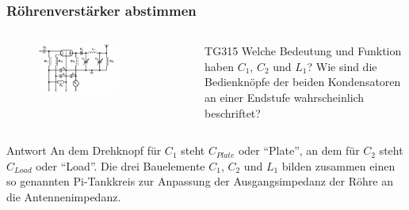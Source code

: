 \begin{frame}
  \frametitle{Röhrenverstärker abstimmen}
  \begin{columns}
    \begin{figure}
      \includegraphics[width=0.65\textwidth,height=.5\textheight,keepaspectratio]{a07/TG313.png}
    \end{figure}
    \begin{center}
      \begin{exampleblock}{TG315}
        Welche Bedeutung und Funktion haben $C_1$, $C_2$ und $L_1$? Wie sind die Bedienknöpfe der beiden Kondensatoren an einer Endstufe wahrscheinlich beschriftet?
      \end{exampleblock}
    \end{center}
  \end{columns}
  \pause
  \begin{exampleblock}{Antwort}
    An dem Drehknopf für $C_1$ steht $C_{Plate}$ oder ``Plate'', an dem für $C_2$ steht $C_{Load}$ oder ``Load''. Die drei Bauelemente $C_1$, $C_2$ und $L_1$ bilden zusammen einen so genannten Pi-Tankkreis zur Anpassung der Ausgangsimpedanz der Röhre an die Antennenimpedanz.
  \end{exampleblock}
\end{frame}

